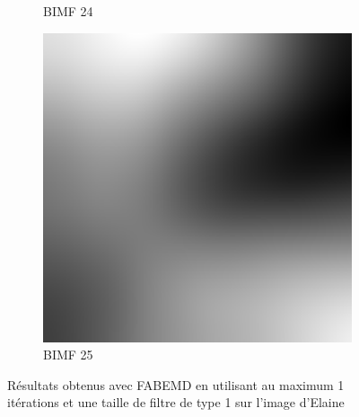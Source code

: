 \begin{figure}
\begin{subfigure}{.30\textwidth}
  \caption{BIMF 24}
\end{subfigure}
\begin{subfigure}{.30\textwidth}
  \centering
  \includegraphics[width=.9\linewidth]{img/e_1_1_25}
  \caption{BIMF 25}
\end{subfigure}
\caption{Résultats obtenus avec FABEMD en utilisant au maximum 1 itérations et une taille de filtre de type 1 sur l'image d'Elaine}
\label{fig:e_5_4}
\end{figure}

